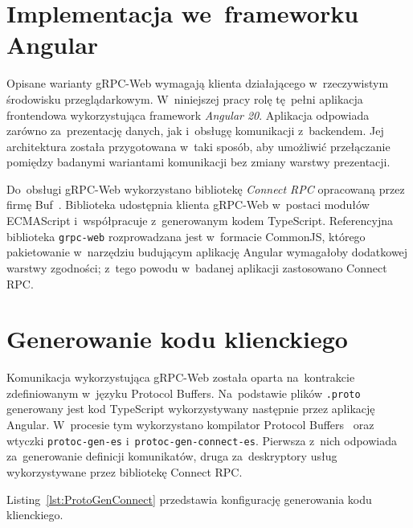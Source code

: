 \section{Implementacja we~frameworku Angular}

\label{sec:ImplementacjagRPCWeb}


Opisane warianty gRPC-Web wymagają klienta działającego w~rzeczywistym środowisku przeglądarkowym. W~niniejszej pracy rolę tę~pełni aplikacja frontendowa wykorzystująca framework \textit{Angular 20}. Aplikacja odpowiada zarówno za~prezentację danych, jak i~obsługę komunikacji z~backendem. Jej architektura została przygotowana w~taki sposób, aby umożliwić przełączanie pomiędzy badanymi wariantami komunikacji bez zmiany warstwy prezentacji.

Do~obsługi gRPC-Web wykorzystano bibliotekę \textit{Connect RPC} opracowaną przez firmę Buf~\cite{bib:ConnectRPC}. Biblioteka udostępnia klienta gRPC-Web w~postaci modułów ECMAScript i~współpracuje z~generowanym kodem TypeScript. Referencyjna biblioteka \texttt{grpc-web} rozprowadzana jest w~formacie CommonJS, którego pakietowanie w~narzędziu budującym aplikację Angular wymagałoby dodatkowej warstwy zgodności; z~tego powodu w~badanej aplikacji zastosowano Connect RPC.


\section{Generowanie kodu klienckiego}

\label{sec:ConnectRPC}


Komunikacja wykorzystująca gRPC-Web została oparta na~kontrakcie zdefiniowanym w~języku Protocol Buffers. Na~podstawie plików \texttt{.proto} generowany jest kod TypeScript wykorzystywany następnie przez aplikację Angular. W~procesie tym wykorzystano kompilator Protocol Buffers~\cite{bib:ProtoGen} oraz wtyczki \texttt{protoc-gen-es} i~\texttt{protoc-gen-connect-es}. Pierwsza z~nich odpowiada za~generowanie definicji komunikatów, druga za~deskryptory usług wykorzystywane przez bibliotekę Connect RPC.

Listing~\ref{lst:ProtoGenConnect} przedstawia konfigurację generowania kodu klienckiego.

